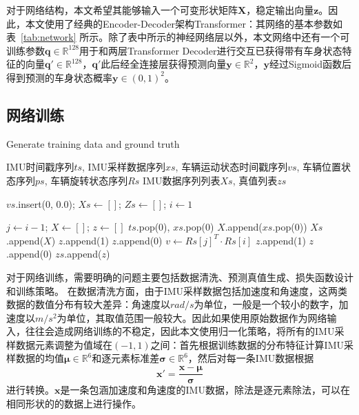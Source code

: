 对于网络结构，本文希望其能够输入一个可变形状矩阵$\symbf{X}$，稳定输出向量$\symbf{z}$。因此，本文使用了经典的Encoder-Decoder架构Transformer\cite{vaswani2017attention}：其网络的基本参数如表~\ref{tab:network} 所示。除了表中所示的神经网络层以外，本文网络中还有一个可训练参数$\symbf{q} \in \mathbb{R}^{128}$用于和两层Transformer Decoder进行交互已获得带有车身状态特征的向量$\symbf{q}' \in \mathbb{R}^{128}$，$\symbf{q}'$此后经全连接层获得预测向量$\symbf{y} \in \mathbb{R}^2$，$\symbf{y}$经过Sigmoid函数后得到预测的车身状态概率$\symbf{y} \in (0, 1)^2$。

\subsection{网络训练}

\renewcommand{\algorithmicrequire}{\textbf{输入：}\unskip}
\renewcommand{\algorithmicensure}{\textbf{输出：}\unskip}
\begin{algorithm}
  \caption{Generate training data and ground truth}
  \label{alg1}
  \small
  \begin{algorithmic}[1]
    \REQUIRE IMU时间戳序列$ts$, IMU采样数据序列$xs$, 车辆运动状态时间戳序列$vs$, 车辆位置状态序列$ps$, 车辆旋转状态序列$Rs$
    \ENSURE IMU数据序列列表$Xs$, 真值列表$zs$

    \STATE $vs$.insert(0, 0.0); $Xs \leftarrow []$; $Zs \leftarrow []$; $i \leftarrow 1$

      \STATE $j \leftarrow i-1$; $X \leftarrow []$; $z \leftarrow []$
        \STATE $ts$.pop(0), $xs$.pop(0)
      \ENDWHILE
        \STATE $X$.append($xs$.pop(0))
      \ENDWHILE
      \STATE $Xs$.append($X$)
        \STATE $z$.append(1)
      \ELSE
        \STATE $z$.append(0)
      \ENDIF
      \STATE $v \leftarrow Rs[j]^T \cdot Rs[i]$
        \STATE $z$.append(1)
      \ELSE
        \STATE $z$.append(0)
      \ENDIF
      \STATE $zs$.append($z$)
    \ENDWHILE
  \end{algorithmic}
\end{algorithm}

对于网络训练，需要明确的问题主要包括数据清洗、预测真值生成、损失函数设计和训练策略。
在数据清洗方面，由于IMU采样数据包括加速度和角速度，这两类数据的数值分布有较大差异：角速度以$rad/s$为单位，一般是一个较小的数字，加速度以$m/s^2$为单位，其取值范围一般较大。因此如果使用原始数据作为网络输入，往往会造成网络训练的不稳定，因此本文使用归一化策略，将所有的IMU采样数据元素调整为值域在$(-1, 1)$之间：首先根据训练数据的分布特征计算IMU采样数据的均值$\symbf{\mu}\in \mathbb{R}^6$和逐元素标准差$\symbf{\sigma}\in \mathbb{R}^6$，然后对每一条IMU数据根据
\begin{equation}
  \symbf{x}' = \frac{\symbf{x} - \symbf{\mu}}{\symbf{\sigma}}
\end{equation}
进行转换。$\symbf{x}$是一条包涵加速度和角速度的IMU数据，除法是逐元素除法，可以在相同形状的的数据上进行操作。

